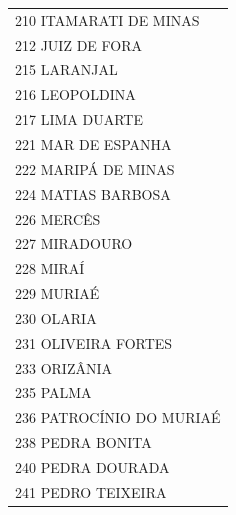 \documentclass{article}
\begin{document}
\begin{longtable}[c]{m{18cm}}
\multicolumn{1}{l}{ \hspace{2em} 210 ITAMARATI DE MINAS } \\
\multicolumn{1}{l}{ \hspace{2em} 212 JUIZ DE FORA } \\
\multicolumn{1}{l}{ \hspace{2em} 215 LARANJAL } \\
\multicolumn{1}{l}{ \hspace{2em} 216 LEOPOLDINA } \\
\multicolumn{1}{l}{ \hspace{2em} 217 LIMA DUARTE } \\
\multicolumn{1}{l}{ \hspace{2em} 221 MAR DE ESPANHA } \\
\multicolumn{1}{l}{ \hspace{2em} 222 MARIPÁ DE MINAS } \\
\multicolumn{1}{l}{ \hspace{2em} 224 MATIAS BARBOSA } \\
\multicolumn{1}{l}{ \hspace{2em} 226 MERCÊS } \\
\multicolumn{1}{l}{ \hspace{2em} 227 MIRADOURO } \\
\multicolumn{1}{l}{ \hspace{2em} 228 MIRAÍ } \\
\multicolumn{1}{l}{ \hspace{2em} 229 MURIAÉ } \\
\multicolumn{1}{l}{ \hspace{2em} 230 OLARIA } \\
\multicolumn{1}{l}{ \hspace{2em} 231 OLIVEIRA FORTES } \\
\multicolumn{1}{l}{ \hspace{2em} 233 ORIZÂNIA } \\
\multicolumn{1}{l}{ \hspace{2em} 235 PALMA } \\
\multicolumn{1}{l}{ \hspace{2em} 236 PATROCÍNIO DO MURIAÉ } \\
\multicolumn{1}{l}{ \hspace{2em} 238 PEDRA BONITA } \\
\multicolumn{1}{l}{ \hspace{2em} 240 PEDRA DOURADA } \\
\multicolumn{1}{l}{ \hspace{2em} 241 PEDRO TEIXEIRA } \\

\end{longtable}
\end{document}
